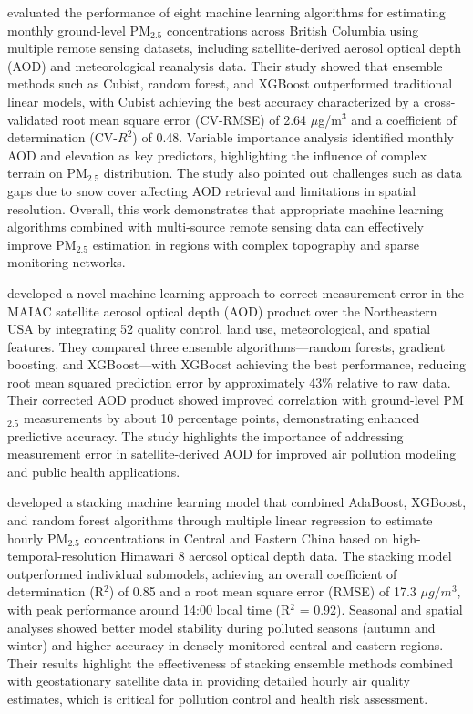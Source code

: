 \documentclass[11pt]{article}
\begin{document}
\citet{xu2018evaluation} evaluated the performance of eight machine learning algorithms for estimating monthly ground-level PM$_{2.5}$ concentrations across British Columbia using multiple remote sensing datasets, including satellite-derived aerosol optical depth (AOD) and meteorological reanalysis data. Their study showed that ensemble methods such as Cubist, random forest, and XGBoost outperformed traditional linear models, with Cubist achieving the best accuracy characterized by a cross-validated root mean square error (CV-RMSE) of 2.64 $\mu$g/m$^3$ and a coefficient of determination (CV-$R^{2}$) of 0.48. Variable importance analysis identified monthly AOD and elevation as key predictors, highlighting the influence of complex terrain on PM$_{2.5}$ distribution. The study also pointed out challenges such as data gaps due to snow cover affecting AOD retrieval and limitations in spatial resolution. Overall, this work demonstrates that appropriate machine learning algorithms combined with multi-source remote sensing data can effectively improve PM$_{2.5}$ estimation in regions with complex topography and sparse monitoring networks.

\citet{just2018correcting} developed a novel machine learning approach to correct measurement error in the MAIAC satellite aerosol optical depth (AOD) product over the Northeastern USA by integrating 52 quality control, land use, meteorological, and spatial features. They compared three ensemble algorithms—random forests, gradient boosting, and XGBoost—with XGBoost achieving the best performance, reducing root mean squared prediction error by approximately 43\% relative to raw data. Their corrected AOD product showed improved correlation with ground-level PM$_{2.5}$ measurements by about 10 percentage points, demonstrating enhanced predictive accuracy. The study highlights the importance of addressing measurement error in satellite-derived AOD for improved air pollution modeling and public health applications.

\citet{chen2019stacking} developed a stacking machine learning model that combined AdaBoost, XGBoost, and random forest algorithms through multiple linear regression to estimate hourly PM$_{2.5}$ concentrations in Central and Eastern China based on high-temporal-resolution Himawari 8 aerosol optical depth data. The stacking model outperformed individual submodels, achieving an overall coefficient of determination (R$^2$) of 0.85 and a root mean square error (RMSE) of 17.3 \(\mu g/m^3\), with peak performance around 14:00 local time (R$^2$ = 0.92). Seasonal and spatial analyses showed better model stability during polluted seasons (autumn and winter) and higher accuracy in densely monitored central and eastern regions. Their results highlight the effectiveness of stacking ensemble methods combined with geostationary satellite data in providing detailed hourly air quality estimates, which is critical for pollution control and health risk assessment.
\end{document}
